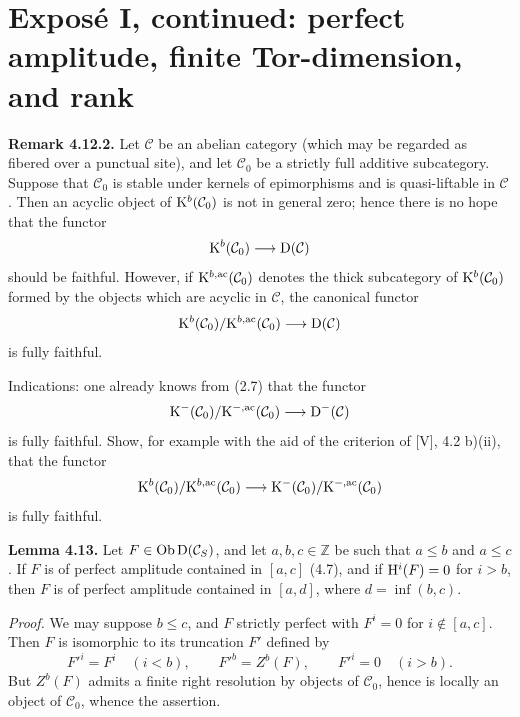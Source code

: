 \documentclass[11pt]{article}
\begin{document}
\providecommand{\Add}{\operatorname{Add}}
\providecommand{\Cart}{\operatorname{Cart}}
\providecommand{\perfamp}{\operatorname{perf.amp}}
\providecommand{\perfdim}{\operatorname{perf.dim}}
\providecommand{\toramp}{\operatorname{tor.amp}}
\providecommand{\torf}{\operatorname{torf}}
\providecommand{\injf}{\operatorname{injf}}
\providecommand{\rg}{\operatorname{rg}}
\providecommand{\is}{\mathrm{is}}
\providecommand{\Mod}{\operatorname{Mod}}


\section*{Exposé I, continued: perfect amplitude, finite Tor-dimension, and rank}

\textbf{Remark 4.12.2.} Let \(\mathcal C\) be an abelian category (which may be regarded as fibered over a punctual site), and let \(\mathcal C_0\) be a strictly full additive subcategory. Suppose that \(\mathcal C_0\) is stable under kernels of epimorphisms and is quasi-liftable in \(\mathcal C\). Then an acyclic object of \(\mathrm K^b(\mathcal C_0)\) is not in general zero; hence there is no hope that the functor
\[
  \mathrm K^b(\mathcal C_0)\longrightarrow \mathrm D(\mathcal C)
\]
should be faithful. However, if \(\mathrm K^{b,\mathrm{ac}}(\mathcal C_0)\) denotes the thick subcategory of \(\mathrm K^b(\mathcal C_0)\) formed by the objects which are acyclic in \(\mathcal C\), the canonical functor
\[
  \mathrm K^b(\mathcal C_0)/\mathrm K^{b,\mathrm{ac}}(\mathcal C_0)
  \longrightarrow \mathrm D(\mathcal C)
\]
is fully faithful.

Indications: one already knows from (2.7) that the functor
\[
  \mathrm K^-(\mathcal C_0)/\mathrm K^{-,\mathrm{ac}}(\mathcal C_0)
  \longrightarrow \mathrm D^-(\mathcal C)
\]
is fully faithful. Show, for example with the aid of the criterion of [V], 4.2 b)(ii), that the functor
\[
  \mathrm K^b(\mathcal C_0)/\mathrm K^{b,\mathrm{ac}}(\mathcal C_0)
  \longrightarrow
  \mathrm K^-(\mathcal C_0)/\mathrm K^{-,\mathrm{ac}}(\mathcal C_0)
\]
is fully faithful.

\textbf{Lemma 4.13.} Let \(F\in\operatorname{Ob} \mathrm D(\mathcal C_S)\), and let \(a,b,c\in\mathbb Z\) be such that \(a\leq b\) and \(a\leq c\). If \(F\) is of perfect amplitude contained in \([a,c]\) (4.7), and if \(\mathrm H^i(F)=0\) for \(i>b\), then \(F\) is of perfect amplitude contained in \([a,d]\), where \(d=\inf(b,c)\).

\emph{Proof.} We may suppose \(b\leq c\), and \(F\) strictly perfect with \(F^i=0\) for \(i\notin [a,c]\). Then \(F\) is isomorphic to its truncation \(F'\) defined by
\[
  F'^i=F^i\quad (i<b),\qquad F'^b=Z^b(F),\qquad F'^i=0\quad (i>b).
\]
But \(Z^b(F)\) admits a finite right resolution by objects of \(\mathcal C_0\), hence is locally an object of \(\mathcal C_0\), whence the assertion.
\end{document}
